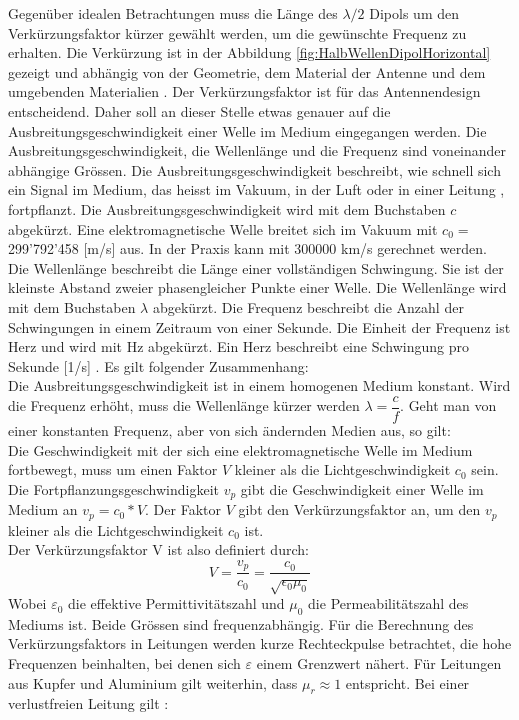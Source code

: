 \newpage
Gegenüber idealen Betrachtungen muss die Länge des $\lambda /2$ Dipols um den Verkürzungsfaktor kürzer gewählt werden, um  die gewünschte Frequenz zu erhalten. Die Verkürzung  ist in der Abbildung \ref{fig:HalbWellenDipolHorizontal} gezeigt und abhängig von der Geometrie, dem Material der Antenne und dem umgebenden Materialien \cite{Hcuno}.
Der Verkürzungsfaktor ist für das Antennendesign entscheidend. Daher soll an dieser Stelle etwas genauer auf die Ausbreitungsgeschwindigkeit einer Welle im Medium eingegangen werden.
Die Ausbreitungsgeschwindigkeit, die Wellenlänge und die Frequenz sind voneinander abhängige Grössen. 
Die Ausbreitungsgeschwindigkeit beschreibt, wie schnell sich ein Signal im Medium, das heisst im Vakuum, in der Luft oder in einer Leitung , fortpflanzt. Die Ausbreitungsgeschwindigkeit wird mit dem Buchstaben $c$ abgekürzt. Eine elektromagnetische Welle breitet sich im
Vakuum mit $c_0 = $ 299'792’458 [m/s] aus. In der Praxis kann mit 300000 km/s gerechnet werden.
Die Wellenlänge beschreibt die Länge einer vollständigen Schwingung. Sie ist der kleinste Abstand zweier phasengleicher Punkte einer Welle. Die Wellenlänge wird mit dem Buchstaben $\lambda$  abgekürzt. Die Frequenz beschreibt  die Anzahl der Schwingungen in einem  Zeitraum von einer Sekunde. Die Einheit der Frequenz ist Herz und wird mit Hz abgekürzt. Ein Herz beschreibt eine Schwingung pro Sekunde [1/s] \cite{Verkuertzungsfaktor}.
Es gilt folgender Zusammenhang:\\
Die Ausbreitungsgeschwindigkeit ist in einem homogenen Medium konstant. Wird die Frequenz erhöht, muss  die Wellenlänge kürzer werden $\lambda = \dfrac{c}{f}$. Geht man von einer konstanten Frequenz, aber von sich ändernden Medien aus, so gilt: \\
Die Geschwindigkeit mit der sich eine elektromagnetische Welle im Medium fortbewegt, muss um einen Faktor $V$ kleiner  als die Lichtgeschwindigkeit $c_0$ sein.\\
Die Fortpflanzungsgeschwindigkeit $v_p$ gibt die Geschwindigkeit einer Welle im Medium an  $v_p=c_0*V $. Der Faktor $V$ gibt den Verkürzungsfaktor an, um den $v_p$ kleiner als die Lichtgeschwindigkeit $c_0$ ist. \\
Der Verkürzungsfaktor V ist also definiert durch:
\begin{equation}
V=\dfrac{v_p}{c_0}=\dfrac{c_0}{\sqrt{\epsilon_0 \mu_0}}
\end{equation}
Wobei $\varepsilon_0$ die effektive Permittivitätszahl
 und $\mu_0$ die Permeabilitätszahl des Mediums ist. Beide Grössen sind  frequenzabhängig. Für die Berechnung des Verkürzungsfaktors in Leitungen werden kurze Rechteckpulse betrachtet, die hohe Frequenzen beinhalten, bei denen sich $\varepsilon$ einem Grenzwert nähert. Für Leitungen aus Kupfer und Aluminium gilt weiterhin, dass $\mu_r \approx 1$ entspricht. Bei einer verlustfreien Leitung gilt \cite{Verkuertzungsfaktor_wiki}:
